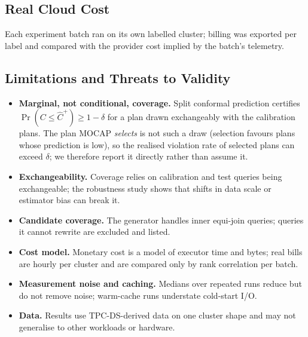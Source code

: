 

\subsection{Real Cloud Cost}
\label{sec:cloud_cost}

Each experiment batch ran on its own labelled cluster; billing was exported per
label and compared with the provider cost implied by the batch's telemetry.



\subsection{Limitations and Threats to Validity}
\label{sec:limitations}

\begin{itemize}
  \item \textbf{Marginal, not conditional, coverage.} Split conformal
  prediction certifies $\Pr(C \le \hat C^{+}) \ge 1-\delta$ for a plan drawn
  exchangeably with the calibration plans. The plan MOCAP \emph{selects} is not
  such a draw (selection favours plans whose prediction is low), so the
  realised violation rate of selected plans can exceed $\delta$; we therefore
  report it directly rather than assume it.
  \item \textbf{Exchangeability.} Coverage relies on calibration and test
  queries being exchangeable; the robustness study shows that shifts in data
  scale or estimator bias can break it.
  \item \textbf{Candidate coverage.} The generator handles inner equi-join
  queries; queries it cannot rewrite are excluded and listed.
  \item \textbf{Cost model.} Monetary cost is a model of executor time and
  bytes; real bills are hourly per cluster and are compared only by rank
  correlation per batch.
  \item \textbf{Measurement noise and caching.} Medians over repeated runs
  reduce but do not remove noise; warm-cache runs understate cold-start I/O.
  \item \textbf{Data.} Results use TPC-DS-derived data on one cluster shape and
  may not generalise to other workloads or hardware.
\end{itemize}
